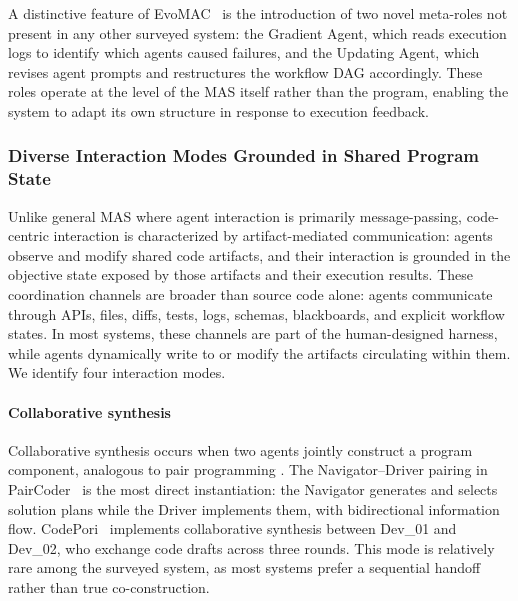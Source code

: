 \documentclass{llmxive}
\begin{document}
A distinctive feature of EvoMAC~\cite{Hu2025EvoMAC} is the
introduction of two novel meta-roles not present in any other
surveyed system: the Gradient Agent, which reads execution logs
to identify which agents caused failures, and the Updating Agent,
which revises agent prompts and restructures the workflow DAG
accordingly. These roles operate at the level of the MAS itself
rather than the program, enabling the system to adapt its own
structure in response to execution feedback.


\subsubsection{Diverse Interaction Modes Grounded in Shared Program State}
Unlike general MAS where agent interaction is primarily
message-passing, code-centric interaction is characterized by
artifact-mediated communication: agents observe and modify shared
code artifacts, and their interaction is grounded in the
objective state exposed by those artifacts and their execution
results. {These coordination channels are broader
than source code alone: agents communicate through APIs, files,
diffs, tests, logs, schemas, blackboards, and explicit workflow
states. In most systems, these channels are part of the
human-designed harness, while agents dynamically write to or
modify the artifacts circulating within them.} We identify four
interaction modes.

\paragraph{Collaborative synthesis} Collaborative synthesis occurs
when two agents jointly construct a program component, analogous
to pair programming \cite{zou2026recursivemas}. The Navigator--Driver pairing in
PairCoder~\cite{Zhang2024PairProgramming} is the most direct
instantiation: the Navigator generates and selects solution plans
while the Driver implements them, with bidirectional information
flow. CodePori~\cite{Rasheed2024Codepori} implements
collaborative synthesis between Dev\_01 and Dev\_02, who exchange
code drafts across three rounds. This mode is relatively rare among the surveyed system, as most systems prefer a sequential handoff
rather than true co-construction.
\end{document}
